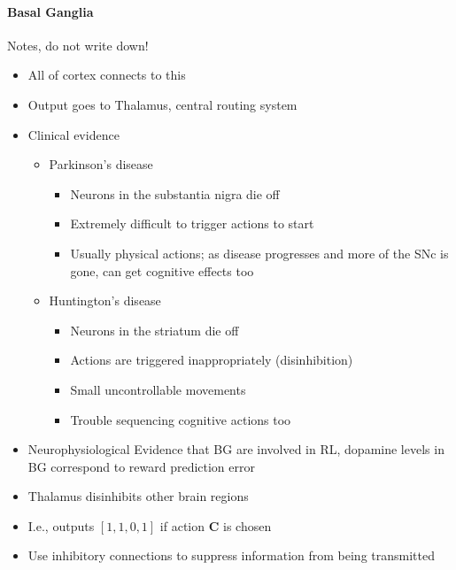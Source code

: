 \documentclass[10pt,letterpaper,oneside]{article}
\begin{document}
\paragraph{Basal Ganglia}
Notes, do not write down!
\begin{itemize}
	\item All of cortex connects to this
	\item Output goes to Thalamus, central routing system
	\item Clinical evidence
	\begin{itemize}
		\item Parkinson's disease
		\begin{itemize}			
			\item Neurons in the substantia nigra die off
			\item Extremely difficult to trigger actions to start
			\item Usually physical actions; as disease progresses and more of the SNc is gone, can get cognitive effects too
			
		\end{itemize}
		\item Huntington's disease
		
		\begin{itemize}
			\item Neurons in the striatum die off
			\item Actions are triggered inappropriately (disinhibition)
			\item Small uncontrollable movements
			\item Trouble sequencing cognitive actions too
		\end{itemize}
	\end{itemize}
	\item Neurophysiological Evidence that BG are involved in RL, dopamine levels in BG correspond to reward prediction error
	\item Thalamus disinhibits other brain regions
	\item I.e., outputs $[1, 1, 0, 1]$ if action \textbf{C} is chosen
	\item Use inhibitory connections to suppress information from being transmitted
\end{itemize}




\printbibliography
\end{document}
